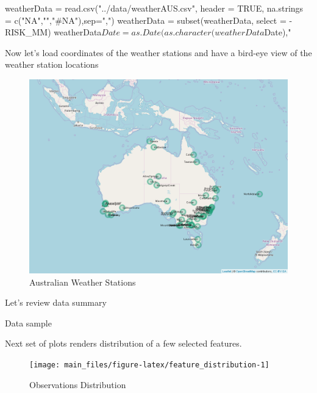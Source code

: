 \begin{Schunk}
\begin{Sinput}
weatherData = read.csv("../data/weatherAUS.csv", header = TRUE, na.strings = c("NA","","#NA"),sep=",")
weatherData = subset(weatherData, select = -RISK_MM)
weatherData$Date = as.Date(as.character(weatherData$Date),"%
\end{Sinput}
\end{Schunk}

Now let's load coordinates of the weather stations and have a bird-eye
view of the weather station locations

\begin{Schunk}
\begin{figure}[H]

{\centering \includegraphics[width=1.1\linewidth]{images/weatherStations} 

}

\caption[Australian Weather Stations]{Australian Weather Stations}\label{fig:map}
\end{figure}
\end{Schunk}

Let's review data summary

Data sample

Next set of plots renders distribution of a few selected features.

\begin{Schunk}
\begin{figure}[H]

{\centering \texttt{[image: main\_files/figure-latex/feature\_distribution-1]} 

}

\caption[Observations Distribution]{Observations Distribution}\label{fig:feature_distribution}
\end{figure}
\end{Schunk}

